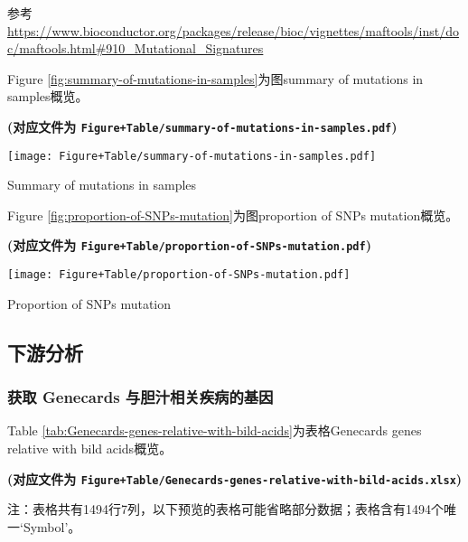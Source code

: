 \documentclass[
]{article}
\begin{document}
参考 \url{https://www.bioconductor.org/packages/release/bioc/vignettes/maftools/inst/doc/maftools.html\#910_Mutational_Signatures}

Figure \ref{fig:summary-of-mutations-in-samples}为图summary of mutations in samples概览。

\textbf{(对应文件为 \texttt{Figure+Table/summary-of-mutations-in-samples.pdf})}

\def\@captype{figure}
\begin{center}
\texttt{[image: Figure+Table/summary-of-mutations-in-samples.pdf]}
\caption{Summary of mutations in samples}\label{fig:summary-of-mutations-in-samples}
\end{center}

Figure \ref{fig:proportion-of-SNPs-mutation}为图proportion of SNPs mutation概览。

\textbf{(对应文件为 \texttt{Figure+Table/proportion-of-SNPs-mutation.pdf})}

\def\@captype{figure}
\begin{center}
\texttt{[image: Figure+Table/proportion-of-SNPs-mutation.pdf]}
\caption{Proportion of SNPs mutation}\label{fig:proportion-of-SNPs-mutation}
\end{center}

\hypertarget{ux4e0bux6e38ux5206ux6790}{%
\subsection{下游分析}\label{ux4e0bux6e38ux5206ux6790}}

\hypertarget{ux83b7ux53d6-genecards-ux4e0eux80c6ux6c41ux76f8ux5173ux75beux75c5ux7684ux57faux56e0}{%
\subsubsection{获取 Genecards 与胆汁相关疾病的基因}\label{ux83b7ux53d6-genecards-ux4e0eux80c6ux6c41ux76f8ux5173ux75beux75c5ux7684ux57faux56e0}}

Table \ref{tab:Genecards-genes-relative-with-bild-acids}为表格Genecards genes relative with bild acids概览。

\textbf{(对应文件为 \texttt{Figure+Table/Genecards-genes-relative-with-bild-acids.xlsx})}

\begin{center}\begin{tcolorbox}[colback=gray!10, colframe=gray!50, width=0.9\linewidth, arc=1mm, boxrule=0.5pt]注：表格共有1494行7列，以下预览的表格可能省略部分数据；表格含有1494个唯一`Symbol'。
\end{tcolorbox}
\end{center}
\end{document}
